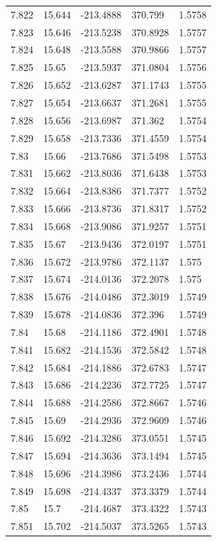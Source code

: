 \begin{tabular}{lllll}
7.822 & 15.644 & -213.4888 & 370.799 & 1.5758 \\
7.823 & 15.646 & -213.5238 & 370.8928 & 1.5757 \\
7.824 & 15.648 & -213.5588 & 370.9866 & 1.5757 \\
7.825 & 15.65 & -213.5937 & 371.0804 & 1.5756 \\
7.826 & 15.652 & -213.6287 & 371.1743 & 1.5755 \\
7.827 & 15.654 & -213.6637 & 371.2681 & 1.5755 \\
7.828 & 15.656 & -213.6987 & 371.362 & 1.5754 \\
7.829 & 15.658 & -213.7336 & 371.4559 & 1.5754 \\
7.83 & 15.66 & -213.7686 & 371.5498 & 1.5753 \\
7.831 & 15.662 & -213.8036 & 371.6438 & 1.5753 \\
7.832 & 15.664 & -213.8386 & 371.7377 & 1.5752 \\
7.833 & 15.666 & -213.8736 & 371.8317 & 1.5752 \\
7.834 & 15.668 & -213.9086 & 371.9257 & 1.5751 \\
7.835 & 15.67 & -213.9436 & 372.0197 & 1.5751 \\
7.836 & 15.672 & -213.9786 & 372.1137 & 1.575 \\
7.837 & 15.674 & -214.0136 & 372.2078 & 1.575 \\
7.838 & 15.676 & -214.0486 & 372.3019 & 1.5749 \\
7.839 & 15.678 & -214.0836 & 372.396 & 1.5749 \\
7.84 & 15.68 & -214.1186 & 372.4901 & 1.5748 \\
7.841 & 15.682 & -214.1536 & 372.5842 & 1.5748 \\
7.842 & 15.684 & -214.1886 & 372.6783 & 1.5747 \\
7.843 & 15.686 & -214.2236 & 372.7725 & 1.5747 \\
7.844 & 15.688 & -214.2586 & 372.8667 & 1.5746 \\
7.845 & 15.69 & -214.2936 & 372.9609 & 1.5746 \\
7.846 & 15.692 & -214.3286 & 373.0551 & 1.5745 \\
7.847 & 15.694 & -214.3636 & 373.1494 & 1.5745 \\
7.848 & 15.696 & -214.3986 & 373.2436 & 1.5744 \\
7.849 & 15.698 & -214.4337 & 373.3379 & 1.5744 \\
7.85 & 15.7 & -214.4687 & 373.4322 & 1.5743 \\
7.851 & 15.702 & -214.5037 & 373.5265 & 1.5743 \\

\end{tabular}
